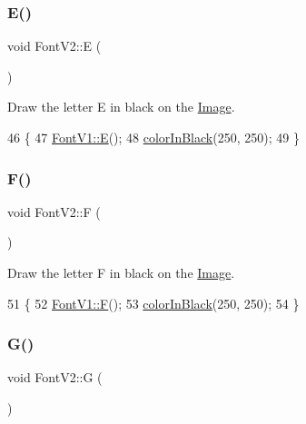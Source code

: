 \subsubsection{\texorpdfstring{E()}{E()}}
{\footnotesize\ttfamily void Font\+V2\+::E (\begin{DoxyParamCaption}{ }\end{DoxyParamCaption})}



Draw the letter E in black on the \mbox{\hyperlink{class_image}{Image}}. 


\begin{DoxyCode}
46                \{
47     \mbox{\hyperlink{class_font_v1_ab8a34299af7a36cfd94c2691b579a0fa}{FontV1::E}}();
48     \mbox{\hyperlink{class_font_v2_a04f2501961bc286ce70fbb6a840b0e8a}{colorInBlack}}(250, 250);
49 \}
\end{DoxyCode}
\mbox{\label{class_font_v2_a061b1fab86aa9bae29fb7460a6ea6401}} 
\subsubsection{\texorpdfstring{F()}{F()}}
{\footnotesize\ttfamily void Font\+V2\+::F (\begin{DoxyParamCaption}{ }\end{DoxyParamCaption})}



Draw the letter F in black on the \mbox{\hyperlink{class_image}{Image}}. 


\begin{DoxyCode}
51                \{
52     \mbox{\hyperlink{class_font_v1_a40dd925bee9092d13ba1a00546cc7160}{FontV1::F}}();
53     \mbox{\hyperlink{class_font_v2_a04f2501961bc286ce70fbb6a840b0e8a}{colorInBlack}}(250, 250);
54 \}
\end{DoxyCode}
\mbox{\label{class_font_v2_a27ece9cc80af5c5d32cad07f00ed714c}} 
\subsubsection{\texorpdfstring{G()}{G()}}
{\footnotesize\ttfamily void Font\+V2\+::G (\begin{DoxyParamCaption}{ }\end{DoxyParamCaption})}



